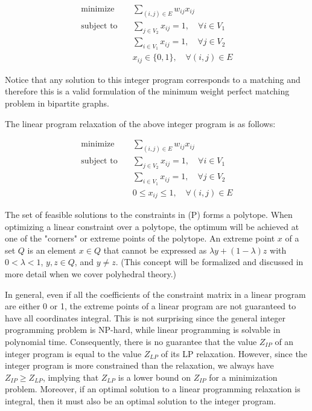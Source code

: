 \begin{equation}
    \begin{aligned}
        \text{minimize} \quad & \sum_{(i, j) \in E} w_{ij} x_{ij} \\
        \text{subject to} \quad & \sum_{j \in V_2} x_{ij} = 1, \quad \forall i \in V_1 \\
        & \sum_{i \in V_1} x_{ij} = 1, \quad \forall j \in V_2 \\
        & x_{ij} \in \{0, 1\}, \quad \forall (i, j) \in E
    \end{aligned}
\end{equation}

Notice that any solution to this integer program corresponds to a matching and therefore this is a valid formulation of the minimum weight perfect matching problem in bipartite graphs.

The linear program relaxation of the above integer program is as follows:

\begin{equation}
    \begin{aligned}
        \text{minimize} \quad & \sum_{(i, j) \in E} w_{ij} x_{ij} \\
        \text{subject to} \quad & \sum_{j \in V_2} x_{ij} = 1, \quad \forall i \in V_1 \\
        & \sum_{i \in V_1} x_{ij} = 1, \quad \forall j \in V_2 \\
        & 0 \leq x_{ij} \leq 1, \quad \forall (i, j) \in E
    \end{aligned}
\end{equation}

The set of feasible solutions to the constraints in (P) forms a polytope. When optimizing a linear constraint over a polytope, the optimum will be achieved at one of the "corners" or extreme points of the polytope. An extreme point $x$ of a set $Q$ is an element $x \in Q$ that cannot be expressed as $\lambda y + (1 - \lambda) z$ with $0 < \lambda < 1$, $y, z \in Q$, and $y \neq z$. (This concept will be formalized and discussed in more detail when we cover polyhedral theory.)

In general, even if all the coefficients of the constraint matrix in a linear program are either 0 or 1, the extreme points of a linear program are not guaranteed to have all coordinates integral. This is not surprising since the general integer programming problem is NP-hard, while linear programming is solvable in polynomial time. Consequently, there is no guarantee that the value $Z_{IP}$ of an integer program is equal to the value $Z_{LP}$ of its LP relaxation. However, since the integer program is more constrained than the relaxation, we always have $Z_{IP} \geq Z_{LP}$, implying that $Z_{LP}$ is a lower bound on $Z_{IP}$ for a minimization problem. Moreover, if an optimal solution to a linear programming relaxation is integral, then it must also be an optimal solution to the integer program.

